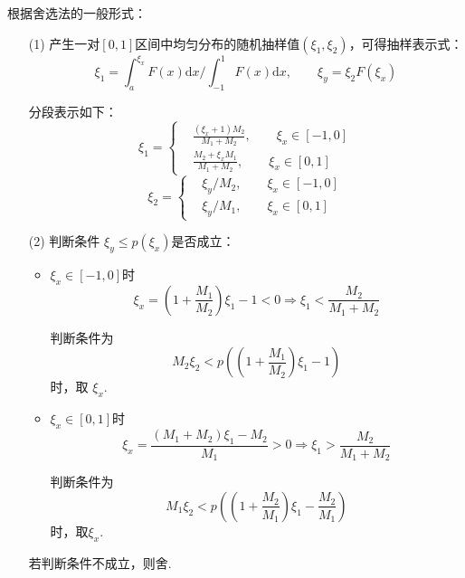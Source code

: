 \documentclass[12pt,a4paper,utf8]{ctexart}
\begin{document}
根据舍选法的一般形式：
\begin{enumerate}
    \item[(1)] 产生一对$[0,1]$区间中均匀分布的随机抽样值$(\xi_1,
        \xi_2)$，可得抽样表示式：
    \begin{equation}
        \xi_1 = \int _a ^{\xi_x}F(x) \textrm{d}x\big / \int_{-1} ^1 F(x) \textrm{d}x,
        \qquad \xi _y = \xi_2 F(\xi_x)
    \end{equation}

    分段表示如下：
    \begin{equation}
        \xi_1= \left\{  
            \begin{aligned}
                &\frac{(\xi_x + 1)M_2}{M_1 + M_2},\qquad \xi_x \in [-1,0] \\
                &\frac{M_2 + \xi_x M_1}{M_1+M_2}, \qquad \xi_x \in [0,1]
            \end{aligned}
            \right .
    \end{equation}
    \begin{equation}
        \xi_2= \left\{
            \begin{aligned}
                &\xi_y / M_2 , \qquad \xi_x \in [-1,0] \\   
                &\xi_y / M_1 , \qquad \xi_x \in [0,1]
            \end{aligned} \right.
    \end{equation}

\item[(2)] 判断条件 $\xi_y \leq p(\xi_x)$是否成立：

    \begin{itemize}
        \item $\xi_x \in [-1,0]$时
            \begin{equation}
                \xi_x = (1+ \frac{M_1}{M_2}) \xi_1 -1 < 0 \Rightarrow
                \xi_1 < \frac{M_2}{M_1+M_2}
            \end{equation}

            判断条件为
            \begin{equation}
                M_2 \xi_2 < p((1+ \frac{M_1}{M_2})\xi_1 - 1) 
            \end{equation}
            时，取 $\xi_x$.

        \item $\xi _x \in [0,1]$时
            \begin{equation}
                \xi_x = \frac{(M_1+M_2)\xi_1 - M_2}{M_1} > 0 \Rightarrow \xi_1 >
                \frac{M_2}{M_1+M_2}
            \end{equation}

            判断条件为
            \begin{equation}
                M_1 \xi_2 < p\left( (1+ \frac{M_2}{M_1})\xi_1 - \frac{M_2}{M_1} \right)
            \end{equation}
            时，取$\xi_x$.
    \end{itemize}
            若判断条件不成立，则舍.
\end{enumerate}
\end{document}
